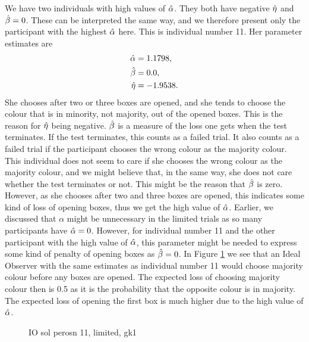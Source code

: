 We have two individuals with high values of $\hat{\alpha}$. They both have negative $\hat{\eta}$ and $\hat{\beta}=0$. These can be interpreted the same way, and we therefore present only the participant with the highest $\hat{\alpha}$ here. This is individual number 11. Her parameter estimates are
\begin{equation}
\label{mles_lim_person11}
    \begin{aligned}
        \hat{\alpha} &= 1.1798,\\
        \hat{\beta} &= 0.0,\\
        \hat{\eta} &= -1.9538.
    \end{aligned}
\end{equation}
She chooses after two or three boxes are opened, and she tends to choose the colour that is in minority, not majority, out of the opened boxes. This is the reason for $\hat{\eta}$ being negative. $\hat{\beta}$ is a measure of the loss one gets when the test terminates. If the test terminates, this counts as a failed trial. It also counts as a failed trial if the participant chooses the wrong colour as the majority colour. This individual does not seem to care if she chooses the wrong colour as the majority colour, and we might believe that, in the same way, she does not care whether the test terminates or not. This might be the reason that $\hat{\beta}$ is zero. However, as she chooses after two and three boxes are opened, this indicates some kind of loss of opening boxes, thus we get the high value of $\hat{\alpha}$. 
Earlier, we discussed that $\alpha$ might be unnecessary in the limited trials as so many participants have $\hat{\alpha}=0$. However, for individual number 11 and the other participant with the high value of $\hat{\alpha}$, this parameter might be needed to express some kind of penalty of opening boxes as $\hat{\beta}=0$.
In Figure \ref{fig:IO_sol_person11_limited_gk1} we see that an Ideal Observer with the same estimates as individual number 11 would choose majority colour before any boxes are opened. The expected loss of choosing majority colour then is 0.5 as it is the probability that the opposite colour is in majority. The expected loss of opening the first box is much higher due to the high value of $\hat{\alpha}$. 
\begin{figure}
    \centering
    \scalebox{0.7}{}
    \caption{IO sol perosn 11, limited, gk1}
    \label{fig:IO_sol_person11_limited_gk1}
\end{figure}


